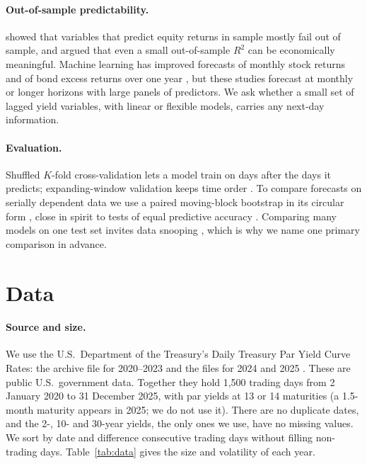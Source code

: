 \documentclass{article}
\begin{document}
\paragraph{Out-of-sample predictability.} \citet{welch2008} showed that variables that predict equity returns in sample mostly fail out of sample, and \citet{campbell2008} argued that even a small out-of-sample $R^2$ can be economically meaningful. Machine learning has improved forecasts of monthly stock returns \citep{gu2020} and of bond excess returns over one year \citep{bianchi2021}, but these studies forecast at monthly or longer horizons with large panels of predictors. We ask whether a small set of lagged yield variables, with linear or flexible models, carries any next-day information.

\paragraph{Evaluation.} Shuffled $K$-fold cross-validation lets a model train on days after the days it predicts; expanding-window validation keeps time order \citep{bergmeir2012}. To compare forecasts on serially dependent data we use a paired moving-block bootstrap \citep{kunsch1989} in its circular form \citep{politis1992}, close in spirit to tests of equal predictive accuracy \citep{diebold1995}. Comparing many models on one test set invites data snooping \citep{white2000}, which is why we name one primary comparison in advance.

\section{Data}\label{sec:data}
\paragraph{Source and size.} We use the U.S.\ Department of the Treasury's Daily Treasury Par Yield Curve Rates: the archive file for 2020--2023 and the files for 2024 and 2025 \citep{treasury2020,treasury2024}. These are public U.S.\ government data. Together they hold 1,500 trading days from 2 January 2020 to 31 December 2025, with par yields at 13 or 14 maturities (a 1.5-month maturity appears in 2025; we do not use it). There are no duplicate dates, and the 2-, 10- and 30-year yields, the only ones we use, have no missing values. We sort by date and difference consecutive trading days without filling non-trading days. Table~\ref{tab:data} gives the size and volatility of each year.
\end{document}
